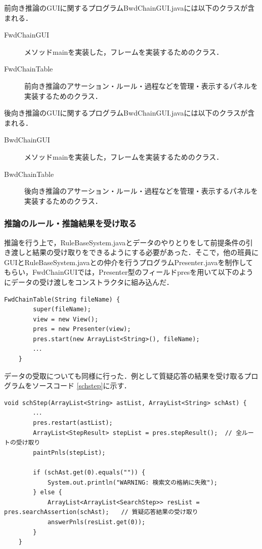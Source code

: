 \documentclass[12pt]{jarticle}
\begin{document}
前向き推論のGUIに関するプログラムBwdChainGUI.javaには以下のクラスが含まれる．
\begin{description}
\item[FwdChainGUI] メソッドmainを実装した，フレームを実装するためのクラス．
\item[FwdChainTable] 前向き推論のアサーション・ルール・過程などを管理・表示するパネルを実装するためのクラス．
\end{description}

後向き推論のGUIに関するプログラムBwdChainGUI.javaには以下のクラスが含まれる．
\begin{description}
\item[BwdChainGUI] メソッドmainを実装した，フレームを実装するためのクラス．
\item[BwdChainTable] 後向き推論のアサーション・ルール・過程などを管理・表示するパネルを実装するためのクラス．
\end{description}

\subsubsection{推論のルール・推論結果を受け取る}
推論を行う上で，RuleBaseSystem.javaとデータのやりとりをして前提条件の引き渡しと結果の受け取りをできるようにする必要があった．そこで，他の班員にGUIとRuleBaseSystem.javaとの仲介を行うプログラムPresenter.javaを制作してもらい，FwdChainGUIでは，Presenter型のフィールドpresを用いて以下のようにデータの受け渡しをコンストラクタに組み込んだ．

\begin{lstlisting}[caption=FwdChainTableクラスのコンストラクタ, label=fwdcons]
    FwdChainTable(String fileName) {
        super(fileName);
        view = new View();
        pres = new Presenter(view);
        pres.start(new ArrayList<String>(), fileName);
        ．．．
    }
\end{lstlisting}

データの受取についても同様に行った．例として質疑応答の結果を受け取るプログラムをソースコード
\ref{schstep}に示す．

\begin{lstlisting}[caption=FwdChainTableクラスのメソッドschStep, label=schstep]
    void schStep(ArrayList<String> astList, ArrayList<String> schAst) {
        ．．．
        pres.restart(astList);
        ArrayList<StepResult> stepList = pres.stepResult();  // 全ルートの受け取り
        paintPnls(stepList);

        if (schAst.get(0).equals("")) {
            System.out.println("WARNING: 検索文の格納に失敗");
        } else {
            ArrayList<ArrayList<SearchStep>> resList = pres.searchAssertion(schAst);　　// 質疑応答結果の受け取り
            answerPnls(resList.get(0));
        }
    }
\end{lstlisting}
\end{document}
